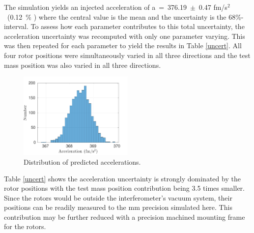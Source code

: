 \documentclass[superscriptaddress, twocolumn, prd]{revtex4-1}
\begin{document}
The simulation yields an injected acceleration of a~=~376.19~$\pm$~0.47 fm/s$^2$~(0.12~\% ) where the central value is the mean and the uncertainty is the 68\%-interval. To assess how each parameter contributes to this total uncertainty, the acceleration uncertainty was recomputed with only one parameter varying. This was then repeated for each parameter to yield the results in Table \ref{uncert}. All four rotor positions were simultaneously varied  in all three directions and the test mass position was also varied in all three directions.

\begin{figure}[!h]
\centering \includegraphics[width=0.5\textwidth]{Super4_Dist.pdf}
\caption{Distribution of predicted accelerations.}
\label{dist} 
\end{figure}


Table \ref{uncert} shows the acceleration uncertainty is strongly dominated by the rotor positions with the test mass position contribution being 3.5 times smaller. Since the rotors would be outside the interferometer's vacuum system, their positions can be readily measured to the mm precision simulated here. This contribution may be further reduced with a precision machined mounting frame for the rotors. 
\end{document}
